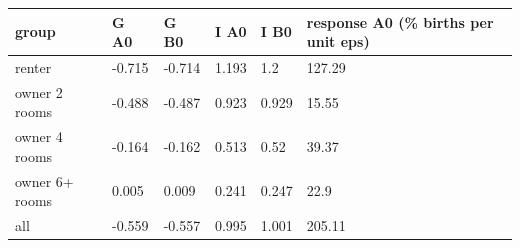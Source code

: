 \begingroup\small
\setlength{\tabcolsep}{3pt}
\renewcommand{\arraystretch}{1.04}
\begin{tabularx}{\linewidth}{XXXXXX}
\toprule
group & G A0 & G B0 & I A0 & I B0 & response A0 (\% births per unit eps) \\
\midrule
renter & -0.715 & -0.714 & 1.193 & 1.2 & 127.29 \\
owner 2 rooms & -0.488 & -0.487 & 0.923 & 0.929 & 15.55 \\
owner 4 rooms & -0.164 & -0.162 & 0.513 & 0.52 & 39.37 \\
owner 6+ rooms & 0.005 & 0.009 & 0.241 & 0.247 & 22.9 \\
all & -0.559 & -0.557 & 0.995 & 1.001 & 205.11 \\
\bottomrule
\end{tabularx}
\endgroup
